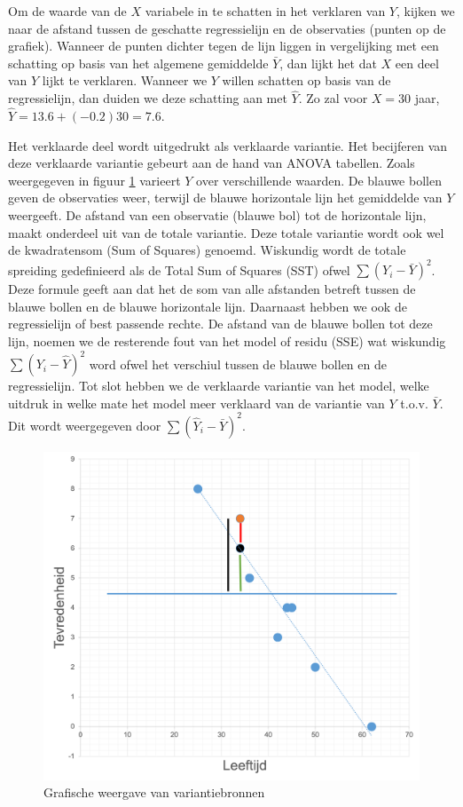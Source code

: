 \documentclass[
]{book}
\theoremstyle{definition}
\theoremstyle{definition}
\theoremstyle{definition}
\theoremstyle{definition}
\theoremstyle{remark}
\begin{document}
Om de waarde van de \(X\) variabele in te schatten in het verklaren van \(Y\), kijken we naar de afstand tussen de geschatte regressielijn en de observaties (punten op de grafiek). Wanneer de punten dichter tegen de lijn liggen in vergelijking met een schatting op basis van het algemene gemiddelde \(\bar{Y}\), dan lijkt het dat \(X\) een deel van \(Y\) lijkt te verklaren. Wanneer we \(Y\) willen schatten op basis van de regressielijn, dan duiden we deze schatting aan met \(\hat{Y}\). Zo zal voor \(X = 30\) jaar, \(\hat{Y} = 13.6 + (-0.2)30 = 7.6\).

Het verklaarde deel wordt uitgedrukt als verklaarde variantie. Het becijferen van deze verklaarde variantie gebeurt aan de hand van ANOVA tabellen. Zoals weergegeven in figuur \ref{fig:lmsst} varieert \(Y\) over verschillende waarden. De blauwe bollen geven de observaties weer, terwijl de blauwe horizontale lijn het gemiddelde van \(Y\) weergeeft. De afstand van een observatie (blauwe bol) tot de horizontale lijn, maakt onderdeel uit van de totale variantie. Deze totale variantie wordt ook wel de kwadratensom (Sum of Squares) genoemd. Wiskundig wordt de totale spreiding gedefinieerd als de Total Sum of Squares (SST) ofwel \(\sum ({Y}_i - \bar{Y})^2\). Deze formule geeft aan dat het de som van alle afstanden betreft tussen de blauwe bollen en de blauwe horizontale lijn. Daarnaast hebben we ook de regressielijn of best passende rechte. De afstand van de blauwe bollen tot deze lijn, noemen we de resterende fout van het model of residu (SSE) wat wiskundig \(\sum ({Y}_i - \hat{Y})^2\) word ofwel het verschiul tussen de blauwe bollen en de regressielijn. Tot slot hebben we de verklaarde variantie van het model, welke uitdruk in welke mate het model meer verklaard van de variantie van \(Y\) t.o.v. \(\bar{Y}\). Dit wordt weergegeven door \(\sum (\hat{Y}_i - \bar{Y})^2\).

\begin{figure}
\includegraphics[width=1\linewidth]{img/lm_sst} \caption{Grafische weergave van variantiebronnen}\label{fig:lmsst}
\end{figure}
\end{document}
